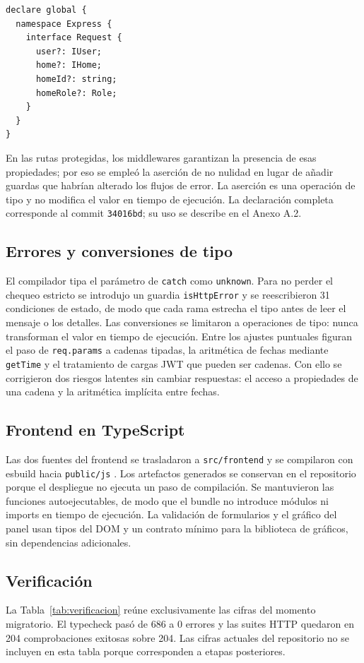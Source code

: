 \documentclass[conference]{IEEEtran}
\begin{document}
\begin{lstlisting}[caption={Augmentación de \texttt{Express.Request}},
label={lst:express}]
declare global {
  namespace Express {
    interface Request {
      user?: IUser;
      home?: IHome;
      homeId?: string;
      homeRole?: Role;
    }
  }
}
\end{lstlisting}

En las rutas protegidas, los middlewares garantizan la presencia de esas
propiedades; por eso se empleó la aserción de no nulidad en lugar de añadir
guardas que habrían alterado los flujos de error. La aserción es una operación
de tipo y no modifica el valor en tiempo de ejecución. La declaración completa
corresponde al commit \texttt{34016bd}; su uso se describe en el Anexo A.2.

\subsection{Errores y conversiones de tipo}
El compilador tipa el parámetro de \texttt{catch} como \texttt{unknown}. Para
no perder el chequeo estricto se introdujo un guardia
\texttt{isHttpError} y se reescribieron 31 condiciones de estado, de modo que
cada rama estrecha el tipo antes de leer el mensaje o los detalles. Las
conversiones se limitaron a operaciones de tipo: nunca transforman el valor en
tiempo de ejecución. Entre los ajustes puntuales figuran el paso de
\texttt{req.params} a cadenas tipadas, la aritmética de fechas mediante
\texttt{getTime} y el tratamiento de cargas JWT que pueden ser cadenas. Con
ello se corrigieron dos riesgos latentes sin cambiar respuestas: el acceso a
propiedades de una cadena y la aritmética implícita entre fechas.

\subsection{Frontend en TypeScript}
Las dos fuentes del frontend se trasladaron a \texttt{src/frontend} y se
compilaron con esbuild hacia \texttt{public/js} \cite{esbuild}. Los artefactos
generados se conservan en el repositorio porque el despliegue no ejecuta un
paso de compilación. Se mantuvieron las funciones autoejecutables, de modo que
el bundle no introduce módulos ni imports en tiempo de ejecución. La validación
de formularios y el gráfico del panel usan tipos del DOM y un contrato mínimo
para la biblioteca de gráficos, sin dependencias adicionales.

\subsection{Verificación}
La Tabla~\ref{tab:verificacion} reúne exclusivamente las cifras del momento
migratorio. El typecheck pasó de 686 a 0 errores y las suites HTTP quedaron en
204 comprobaciones exitosas sobre 204. Las cifras actuales del repositorio no
se incluyen en esta tabla porque corresponden a etapas posteriores.
\end{document}
